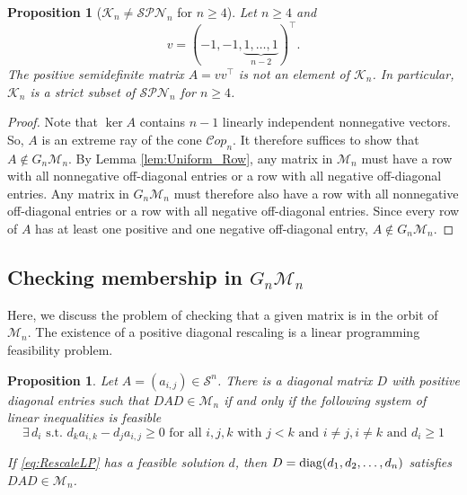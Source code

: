 \documentclass{amsart}
\def\diag{{\rm diag}}
\newcommand{\cM}{\mathcal{M}}
\newcommand{\cS}{\mathcal{S}}
\newcommand{\cK}{\mathcal{K}}
\newcommand{\Cop}{\mathcal{C}op}
\newcommand{\SPN}{\mathcal{SPN}}
\newtheorem{proposition}[theorem]{Proposition}
\theoremstyle{definition}
\begin{document}
\begin{proposition}[$\cK_n\neq \SPN_n$ for $n \geq 4$]
Let $n\ge 4$ and  
\[
v = (-1,-1,\underbrace{1,\dots,1}_{n-2})^\top .
\]
%
The positive semidefinite matrix $A = vv^\top$ is not an element of $\cK_n$. In particular, $\cK_n$ is a \emph{strict} subset of $\SPN_n$ for $n \geq 4$. 
\end{proposition}

\begin{proof}
Note that $\ker A$ contains $n -1$ linearly independent nonnegative vectors. So, $A$ is an extreme ray of the cone $\Cop_n$. It therefore suffices to show that $A \not \in G_n\cM_n$. By Lemma \ref{lem:Uniform_Row}, any matrix in $\cM_n$ must have a row with all nonnegative off-diagonal entries or a row with all negative off-diagonal entries. Any matrix in $G_n\cM_n$ must therefore also have a row with all nonnegative off-diagonal entries or a row with all negative off-diagonal entries. Since every row of $A$ has at least one positive and one negative off-diagonal entry, $A \not \in G_n\cM_n$.
\end{proof}

\subsection{Checking membership in $G_n\cM_n$}

Here, we discuss the problem of checking that a given matrix is in the orbit of $\cM_n$. The existence of a positive diagonal rescaling is a linear programming feasibility problem. 

\begin{proposition}\label{prop:Rescale_into_Mn}
Let $A = (a_{i,j}) \in \cS^n$. There is a diagonal matrix $D$ with positive diagonal entries such that $DAD \in \cM_n$ if and only if the following system of linear inequalities is feasible
%
\begin{equation}\label{eq:RescaleLP}\exists \, d_i \text{ s.t. } d_ka_{i,k} - d_ja_{i,j}\geq 0 \text{ for all } i,j,k \text{ with } j<k\text{ and } i\neq j, i\neq k \text{ and } d_i \geq 1\end{equation}

If \eqref{eq:RescaleLP} has a feasible solution $d$, then $D = \diag(d_1,d_2,\ldots, d_n)$ satisfies $DAD \in \cM_n$. 
\end{proposition}
\end{document}
